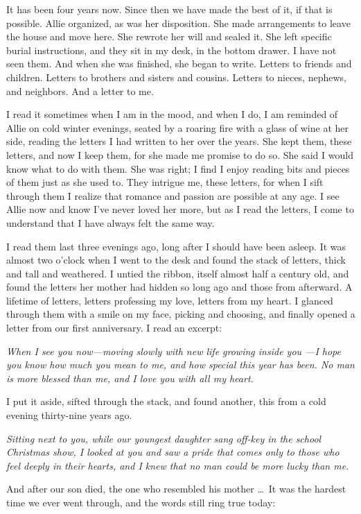 \documentclass[10pt, twoside, openright]{book}
\begin{document}
It has been four years now. Since then we have made the best of it, if
that is possible. Allie organized, as was her disposition. She made
arrangements to leave the house and move here. She rewrote her will and
sealed it. She left specific burial instructions, and they sit in my
desk, in the bottom drawer. I have not seen them. And when she was
finished, she began to write. Letters to friends and children. Letters
to brothers and sisters and cousins. Letters to nieces, nephews, and
neighbors. And a letter to me.

I read it sometimes when I am in the mood, and when I do, I am reminded
of Allie on cold winter evenings, seated by a roaring fire with a glass
of wine at her side, reading the letters I had written to her over the
years. She kept them, these letters, and now I keep them, for she made
me promise to do so. She said I would know what to do with them. She was
right; I find I enjoy reading bits and pieces of them just as she used
to. They intrigue me, these letters, for when I sift through them I
realize that romance and passion are possible at any age. I see Allie
now and know I've never loved her more, but as I read the letters, I
come to understand that I have always felt the same way.

I read them last three evenings ago, long after I should have been
asleep. It was almost two o'clock when I went to the desk and found the
stack of letters, thick and tall and weathered. I untied the ribbon,
itself almost half a century old, and found the letters her mother had
hidden so long ago and those from afterward. A lifetime of letters,
letters professing my love, letters from my heart. I glanced through
them with a smile on my face, picking and choosing, and finally opened a
letter from our first anniversary. I read an excerpt:


\emph{When I see you now---moving slowly with new life growing inside
you ---I hope you know how much you mean to me, and how special this
year has been. No man is more blessed than me, and I love you with all
my heart.}


I put it aside, sifted through the stack, and found another, this from a
cold evening thirty-nine years ago.


\emph{Sitting next to you, while our youngest daughter sang off-key in
the school Christmas show, I looked at you and saw a pride that comes
only to those who feel deeply in their hearts, and I knew that no man
could be more lucky than me.}


And after our son died, the one who resembled his mother   \dots\ It was
the hardest time we ever went through, and the words still ring true
today:
\end{document}
